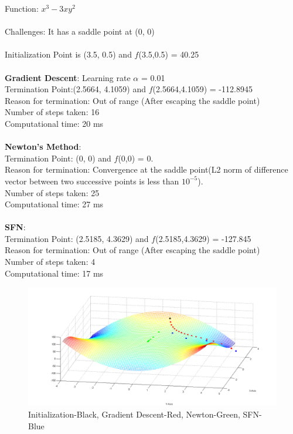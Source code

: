 
\newpage

Function: $x^3-3xy^2$
\\\\
Challenges: It has a saddle point at (0, 0)
\\\\
Initialization Point is (3.5, 0.5) and $f$(3.5,0.5) = 40.25
\\\\
\textbf{Gradient Descent}: Learning rate $\alpha$ = 0.01
\\Termination Point:(2.5664, 4.1059) and $f$(2.5664,4.1059) = -112.8945
\\Reason for termination: Out of range (After escaping the saddle point)
\\Number of steps taken: 16
\\Computational time: 20 ms
\\\\
\textbf{Newton’s Method}:
\\Termination Point: (0, 0) and $f$(0,0) = 0.
\\Reason for termination: Convergence at the saddle point(L2 norm of difference vector between two successive points is less than $10^{-5}$).
\\Number of steps taken: 25
\\Computational time: 27 ms
\\\\
\textbf{SFN}: 
\\Termination Point: (2.5185, 4.3629) and $f$(2.5185,4.3629) = -127.845
\\Reason for termination: Out of range (After escaping the saddle point)
\\Number of steps taken: 4
\\Computational time: 17 ms

\begin{figure}[H]
\includegraphics[scale = 0.45]{2.png}
\caption{Initialization-Black, Gradient Descent-Red, Newton-Green, SFN-Blue}
\end{figure}

